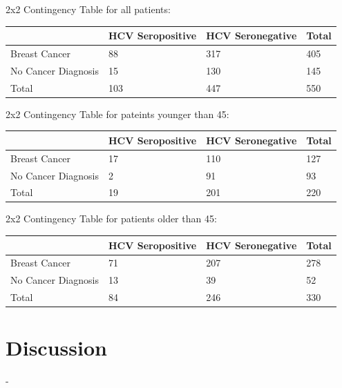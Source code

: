 \documentclass[12pt, titlepage]{article}
\begin{document}
\vspace{1cm}

2x2 Contingency Table for all patients:

\begin{tabular}{ | m{4cm} | m{4cm}| m{4cm} | m{2cm} | }
  \hline
    & HCV Seropositive & HCV Seronegative & Total\\ 
  \hline
  Breast Cancer & 88 & 317 & 405 \\ 
  \hline
  No Cancer Diagnosis & 15 & 130 & 145 \\ 
  \hline
  Total & 103 & 447 & 550 \\ 
  \hline
\end{tabular}

\vspace{1cm}

2x2 Contingency Table for pateints younger than 45:

\begin{tabular}{ | m{4cm} | m{4cm}| m{4cm} | m{2cm} | }
  \hline
    & HCV Seropositive & HCV Seronegative & Total\\ 
  \hline
  Breast Cancer & 17 & 110 & 127 \\ 
  \hline
  No Cancer Diagnosis & 2 & 91 & 93 \\ 
  \hline
  Total & 19 & 201 & 220 \\ 
  \hline
\end{tabular}

\vspace{1cm}

2x2 Contingency Table for patients older than 45:

\begin{tabular}{ | m{4cm} | m{4cm}| m{4cm} | m{2cm} | }
  \hline
    & HCV Seropositive & HCV Seronegative & Total\\ 
  \hline
  Breast Cancer & 71 & 207 & 278 \\ 
  \hline
  No Cancer Diagnosis & 13 & 39 & 52 \\ 
  \hline
  Total & 84 & 246 & 330 \\ 
  \hline
\end{tabular}

\section{Discussion}
\label{sec:discuss}

-




\end{document}
